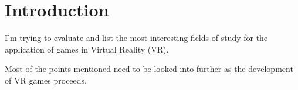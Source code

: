 \section{Introduction}
I'm trying to evaluate and list the most interesting fields of study for the application of games in Virtual Reality (VR).

Most of the  points mentioned need to be looked into further as the development of VR games proceeds.


